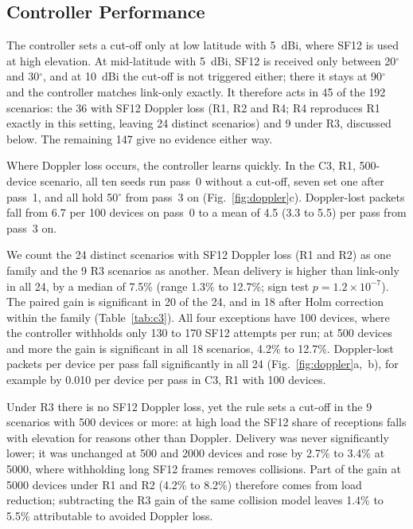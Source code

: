 \documentclass[journal]{IEEEtran}
\begin{document}
\subsection{Controller Performance}
The controller sets a cut-off only at low latitude with 5~dBi, where SF12 is used at high elevation. At mid-latitude with 5~dBi, SF12 is received only between 20$^\circ$ and 30$^\circ$, and at 10~dBi the cut-off is not triggered either; there it stays at 90$^\circ$ and the controller matches link-only exactly. It therefore acts in 45 of the 192 scenarios: the 36 with SF12 Doppler loss (R1, R2 and R4; R4 reproduces R1 exactly in this setting, leaving 24 distinct scenarios) and 9 under R3, discussed below. The remaining 147 give no evidence either way.

Where Doppler loss occurs, the controller learns quickly. In the C3, R1, 500-device scenario, all ten seeds run pass~0 without a cut-off, seven set one after pass~1, and all hold 50$^\circ$ from pass~3 on (Fig.~\ref{fig:doppler}c). Doppler-lost packets fall from 6.7 per 100 devices on pass~0 to a mean of 4.5 (3.3 to 5.5) per pass from pass~3 on.

We count the 24 distinct scenarios with SF12 Doppler loss (R1 and R2) as one family and the 9 R3 scenarios as another. Mean delivery is higher than link-only in all 24, by a median of 7.5\% (range 1.3\% to 12.7\%; sign test $p=1.2\times10^{-7}$). The paired gain is significant in 20 of the 24, and in 18 after Holm correction within the family (Table~\ref{tab:c3}). All four exceptions have 100 devices, where the controller withholds only 130 to 170 SF12 attempts per run; at 500 devices and more the gain is significant in all 18 scenarios, 4.2\% to 12.7\%. Doppler-lost packets per device per pass fall significantly in all 24 (Fig.~\ref{fig:doppler}a,~b), for example by 0.010 per device per pass in C3, R1 with 100 devices.

Under R3 there is no SF12 Doppler loss, yet the rule sets a cut-off in the 9 scenarios with 500 devices or more: at high load the SF12 share of receptions falls with elevation for reasons other than Doppler. Delivery was never significantly lower; it was unchanged at 500 and 2000 devices and rose by 2.7\% to 3.4\% at 5000, where withholding long SF12 frames removes collisions. Part of the gain at 5000 devices under R1 and R2 (4.2\% to 8.2\%) therefore comes from load reduction; subtracting the R3 gain of the same collision model leaves 1.4\% to 5.5\% attributable to avoided Doppler loss.
\end{document}
